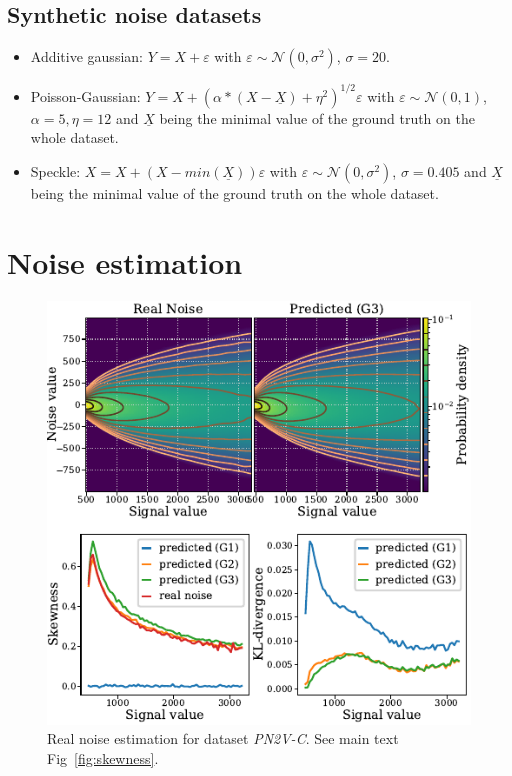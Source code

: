 \documentclass{article}
\begin{document}
\subsection{Synthetic noise datasets}
\label{si:synthetic}
\begin{itemize}
  \item Additive gaussian: $Y = X + \varepsilon$ with $\varepsilon \sim \mathcal{N}(0, \sigma^2)$, $\sigma=20$.
  \item Poisson-Gaussian: $Y = X + (\alpha * (X-\underline{X}) + \eta^2 )^{1/2}\varepsilon$  with $\varepsilon \sim \mathcal{N}(0, 1)$, $\alpha=5, \eta=12$ and $\underline{X}$ being the minimal value of the ground truth on the whole dataset.
  \item Speckle: $X = X + (X-min(\underline{X}))\varepsilon$  with $\varepsilon \sim \mathcal{N}(0, \sigma^2)$, $\sigma=0.405$ and $\underline{X}$ being the minimal value of the ground truth on the whole dataset.
\end{itemize}

\section{Noise estimation}
\label{si:skewness}
\begin{figure}[ht]
\begin{center}
\centerline{\includegraphics[width=\columnwidth]{fig_skewness_pn2v-C.pdf}}
\caption{Real noise estimation for dataset \textit{PN2V-C}. See main text Fig~\ref{fig:skewness}.
}
\end{center}
\vskip -0.2in
\end{figure}
\end{document}
